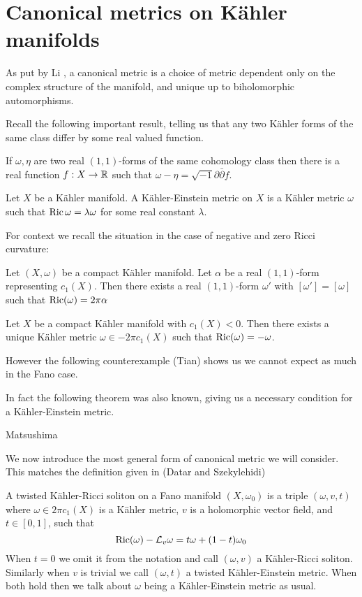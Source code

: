 \section{Canonical metrics on K\"ahler manifolds}
As put by Li \cite{li06}, a canonical metric is a choice of metric dependent only on the complex structure of the manifold, and unique up to biholomorphic automorphisms.

Recall the following important result, telling us that any two K\"ahler forms of the same class differ by some real valued function.
\begin{lemma}
If \(\omega, \eta\) are two real \((1,1)\)-forms of the same cohomology class then there is a real function \(f: X \to \mathbb{R}\) such that \(\omega - \eta = \sqrt{-1} \partial \bar{\partial} f\).
\end{lemma}
\begin{definition}
Let \(X\) be a K\"ahler manifold. A K\"ahler-Einstein metric on \(X\) is a K\"ahler metric \(\omega\) such that \(\mathop{\rm Ric}\nolimits \omega = \lambda \omega\) for some real constant \(\lambda\).
\end{definition}
For context we recall the situation in the case of negative and zero Ricci curvature:
\begin{theorem}
Let \((X,\omega)\) be a compact K\"ahler manifold. Let \(\alpha\) be a real \((1,1)\)-form representing \(c_1(X)\). Then there exists a real \((1,1)\)-form \(\omega'\) with \([\omega'] = [\omega]\) such that \(\mathop{\rm Ric}\nolimits(\omega) = 2 \pi \alpha \)
\end{theorem}
\begin{theorem}
Let \(X\) be a compact K\"ahler manifold with \(c_1(X) < 0 \). Then there exists a unique K\"ahler metric \(\omega \in -2 \pi c_1(X)\) such that \(\mathop{\rm Ric}\nolimits(\omega) = -\omega\).
\end{theorem}
However the following counterexample (Tian) shows us we cannot expect as much in the Fano case.
\begin{example}

\end{example}
In fact the following theorem was also known, giving us a necessary condition for a K\"ahler-Einstein metric.
\begin{theorem}
Matsushima
\end{theorem}
We now introduce the most general form of canonical metric we will consider. This matches the definition given in (Datar and Szekylehidi)
\begin{definition} \label{def:tKRS}
A twisted K\"ahler-Ricci soliton on a Fano manifold \((X,\omega_0)\) is a triple \((\omega,v, t)\) where \(\omega \in 2 \pi c_1(X)\) is a K\"ahler metric, \(v\) is a holomorphic vector field, and \(t \in [0,1]\), such that
\[
\mathop{\rm Ric}\nolimits(\omega) - \mathcal{L}_v \omega = t \omega + (1-t) \omega_0
\]
When \(t = 0\) we omit it from the notation and call \((\omega,v)\) a K\"ahler-Ricci soliton. Similarly when \(v\) is trivial we call \((\omega,t)\) a twisted K\"ahler-Einstein metric. When both hold then we talk about \(\omega\) being a K\"ahler-Einstein metric as usual.
\end{definition}
